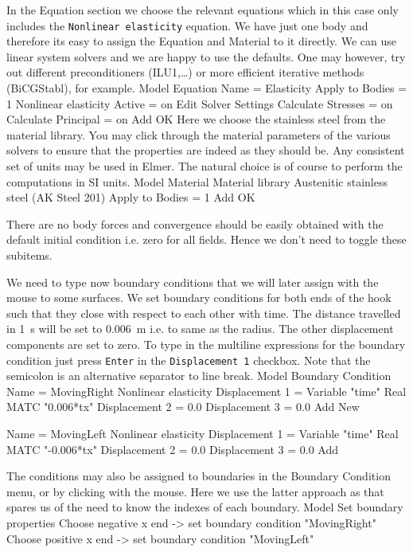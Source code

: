 In the Equation section we choose the relevant equations which in this case only includes 
the \texttt{Nonlinear elasticity} equation.  We have just one body and therefore its easy to assign 
the Equation and Material to it directly.  We can use linear system solvers and we are happy to 
use the defaults. One may however, try out different preconditioners (ILU1,\ldots) or more 
efficient iterative methods (BiCGStabl), for example.
\ttbegin
Model
  Equation
    Name = Elasticity
    Apply to Bodies = 1
    Nonlinear elasticity
      Active = on
      Edit Solver Settings
        Calculate Stresses = on
        Calculate Principal = on
    Add 
    OK
\ttend        
Here we choose the stainless steel from the material library.
You may click through the material parameters of the various solvers to ensure that
the properties are indeed as they should be. Any consistent set of units may be used in Elmer.
The natural choice is of course to perform the computations in SI units. 
\ttbegin
Model
  Material
    Material library    
      Austenitic stainless steel (AK Steel 201)
    Apply to Bodies = 1 
    Add
    OK
\ttend

There are no body forces and convergence should be easily obtained with the default 
initial condition i.e. zero for all fields. Hence we don't need to toggle these subitems. 

We need to type now boundary conditions that we will later assign with the mouse to some surfaces.
We set boundary conditions for both ends of the hook such that
they close with respect to each other with time. The distance travelled in 1~s will be set to
0.006~m i.e. to same as the radius. The other displacement components are set to zero.  
To type in the multiline expressions for the boundary condition just press \texttt{Enter} in the 
\texttt{Displacement 1} checkbox.
Note that the semicolon is an alternative separator
to line break. 
\ttbegin
Model
  Boundary Condition
    Name = MovingRight
    Nonlinear elasticity
      Displacement 1 = Variable "time"
        Real MATC "0.006*tx"
      Displacement 2 = 0.0
      Displacement 3 = 0.0
    Add
    New

    Name = MovingLeft 
    Nonlinear elasticity
      Displacement 1 = Variable "time"
        Real MATC "-0.006*tx"
      Displacement 2 = 0.0
      Displacement 3 = 0.0
    Add 
\ttend   

The conditions may also be assigned to boundaries in the Boundary Condition menu, or
by clicking with the mouse. Here we use the latter approach as that spares us of the 
need to know the indexes of each boundary.
\ttbegin
Model
  Set boundary properties
    Choose negative x end -> set boundary condition "MovingRight"
    Choose positive x end  -> set boundary condition "MovingLeft"
\ttend


